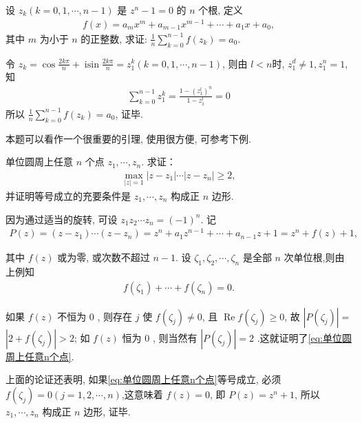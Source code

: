 \begin{example}
	设 $z_k(k=0,1, \cdots, n-1)$ 是 $z^n-1=0$ 的 $n$ 个根, 定义
	\begin{align*}
		f(x)=a_m x^m+a_{m-1} x^{m-1}+\cdots+a_1 x+a_0,
	\end{align*}
	其中 $m$ 为小于 $n$ 的正整数, 求证: $\frac{1}{n} \sum_{k=0}^{n-1} f\left(z_k\right)=a_0$.
\end{example}
\begin{solution}
	令 $z_k=\cos \frac{2 k \pi}{n}+\operatorname{isin} \frac{2 k \pi}{n}=z_1^k(k=0,1, \cdots, n-1)$, 则由 $l<n$时, $z_1^d \neq 1, z_1^n=1$, 知
	\begin{align*}
		\sum_{k=0}^{n-1} z_1^k=\frac{1-\left(z_1^l\right)^n}{1-z_1^l}=0
	\end{align*}
	所以 $\frac{1}{n} \sum_{k=0}^{n-1} f\left(z_k\right)=a_0$, 证毕.
\end{solution}
\begin{note}
	本题可以看作一个很重要的引理, 使用很方便, 可参考下例.
\end{note}

\begin{example}
	单位圆周上任意 $n$ 个点 $z_1, \cdots, z_n$. 求证：
	\begin{align}\label{eq:单位圆周上任意n个点}
		\max _{|z|=1}\left|z-z_1\right| \cdots\left|z-z_n\right| \geqslant 2,
	\end{align}
	并证明等号成立的充要条件是 $z_1, \cdots, z_n$ 构成正 $n$ 边形.
\end{example}
\begin{solution}
	因为通过适当的旋转, 可设 $z_1 z_2 \cdots z_n=(-1)^n$. 记
	\begin{align*}
		P(z)=\left(z-z_1\right) \cdots\left(z-z_n\right)=z^n+a_1 z^{n-1}+\cdots+a_{n-1} z+1=z^n+f(z)+1,
	\end{align*}

	其中 $f(z)$ 或为零, 或次数不超过 $n-1$. 设 $\zeta_1, \zeta_2, \cdots, \zeta_n$ 是全部 $n$ 次单位根,则由上例知
	\begin{align*}
		f\left(\zeta_1\right)+\cdots+f\left(\zeta_n\right)=0 .
	\end{align*}

	如果 $f(z)$ 不恒为 0 , 则存在 $j$ 使 $f\left(\zeta_j\right) \neq 0$, 且 $\operatorname{Re} f\left(\zeta_j\right) \geqslant 0$, 故 $\left|P\left(\zeta_j\right)\right|=$ $\left|2+f\left(\zeta_j\right)\right|>2$; 如 $f(z)$ 恒为 0 , 则当然有 $\left|P\left(\zeta_j\right)\right|=2$ .这就证明了\autoref{eq:单位圆周上任意n个点}.

	上面的论证还表明, 如果\autoref{eq:单位圆周上任意n个点}等号成立, 必须 $f\left(\zeta_j\right)=0(j=1,2, \cdots, n)$,这意味着 $f(z)=0$, 即 $P(z)=z^n+1$, 所以 $z_1, \cdots, z_n$ 构成正 $n$ 边形, 证毕.
\end{solution}

